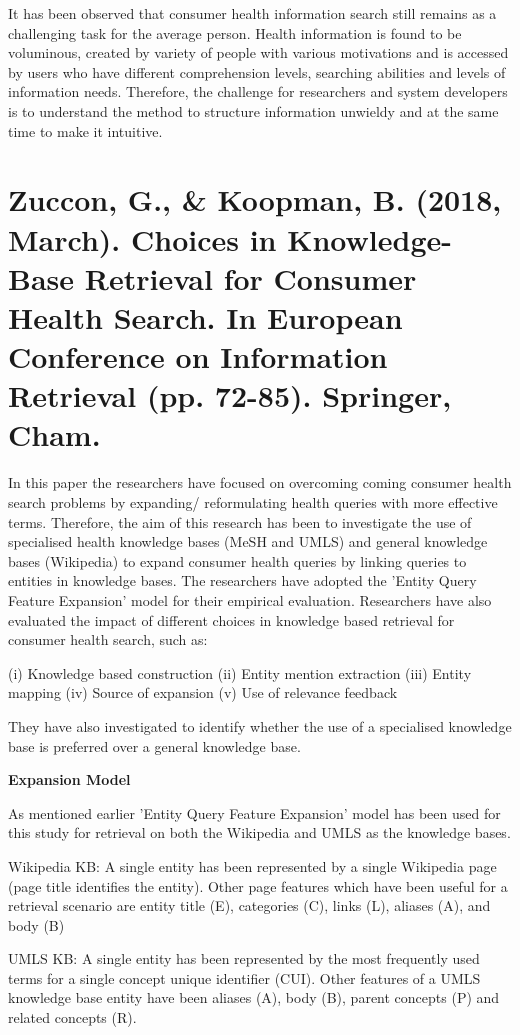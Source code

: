 \documentclass[]{article}
\begin{document}
It has been observed that consumer health information search still remains as a challenging task for the average person. Health information is found to be voluminous, created by variety of people with various motivations and is accessed by users who have different comprehension levels, searching abilities and levels of information needs. Therefore, the challenge for researchers and system developers is to understand the method to structure information unwieldy and at the same time to make it intuitive.  

\section{Zuccon, G., \& Koopman, B. (2018, March). Choices in Knowledge-Base Retrieval for Consumer Health Search. In European Conference on Information Retrieval (pp. 72-85). Springer, Cham.}  

In this paper the researchers have focused on overcoming coming consumer health search problems by expanding/ reformulating health queries with more effective terms. Therefore, the aim of this research has been to investigate the use of specialised health knowledge bases (MeSH and UMLS) and general knowledge bases (Wikipedia) to expand consumer health queries by linking queries to entities in knowledge bases. The researchers have adopted the 'Entity Query Feature Expansion' model for their empirical evaluation. Researchers have also evaluated the impact of different choices in knowledge based retrieval for consumer health search, such as:

(i) Knowledge based construction
(ii) Entity mention extraction
(iii) Entity mapping
(iv) Source of expansion
(v) Use of relevance feedback

They have also investigated to identify whether the use of a specialised knowledge base is preferred over a general knowledge base.           

\textbf{Expansion Model}

As mentioned earlier 'Entity Query Feature Expansion' model has been used for this study for retrieval on both the Wikipedia and UMLS as the knowledge bases.  

Wikipedia KB: A single entity has been represented by a single Wikipedia page (page title identifies the entity). Other page features which have been useful for a retrieval scenario are entity title (E), categories (C), links (L), aliases (A), and body (B)

UMLS KB: A single entity has been represented by the most frequently used terms for a single concept unique identifier (CUI). Other features of a UMLS knowledge base entity have been aliases (A), body (B), parent concepts (P) and related concepts (R). 
\end{document}
